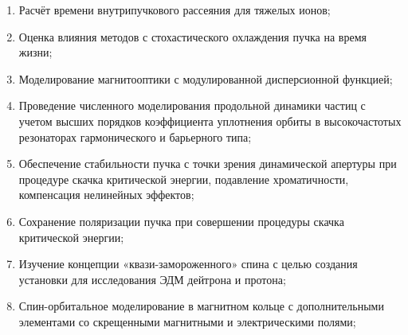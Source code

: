 \begin{enumerate}[beginpenalty=10000] %
  \item Расчёт времени внутрипучкового рассеяния для тяжелых ионов;
  \item Оценка влияния методов с стохастического охлаждения пучка на время жизни;
  \item Моделирование магнитооптики с модулированной дисперсионной функцией;
  \item Проведение численного моделирования продольной динамики частиц с учетом высших порядков коэффициента уплотнения орбиты в высокочастотых резонаторах гармонического и барьерного типа;
  \item Обеспечение стабильности пучка с точки зрения динамической апертуры при процедуре скачка критической энергии, подавление хроматичности, компенсация нелинейных эффектов;
  \item Сохранение поляризации пучка при совершении процедуры скачка критической энергии;
  \item Изучение концепции «квази-замороженного» спина с целью создания установки для исследования ЭДМ дейтрона и протона;
  \item Спин-орбитальное моделирование в магнитном кольце с дополнительными элементами со скрещенными магнитными и электрическими полями;
\end{enumerate}
~\\
\par {\novelty}
